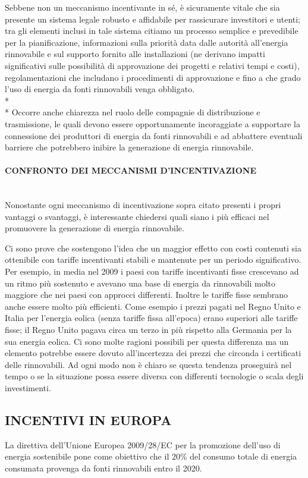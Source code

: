 \documentclass[12pt,a4paper,openright,twoside]{report}
\newcommand{\myparagraph}[1]{\paragraph{#1}\mbox{}\\}
\begin{document}
Sebbene non un meccanismo incentivante in sé, è sicuramente vitale che sia presente un sistema legale robusto e affidabile per rassicurare investitori e utenti; tra gli elementi inclusi in tale sistema citiamo un processo semplice e prevedibile per la pianificazione, informazioni sulla priorità data dalle autorità all'energia rinnovabile e sul supporto fornito alle installazioni (ne derivano impatti significativi sulle possibilità di approvazione dei progetti e relativi tempi e costi), regolamentazioni che includano i procedimenti di approvazione e fino a che grado l'uso di energia da fonti rinnovabili venga obbligato.\\*\\* 
Occorre anche chiarezza nel ruolo delle compagnie di distribuzione e trasmissione, le quali devono essere opportunamente incoraggiate a supportare la connessione dei produttori di energia da fonti rinnovabili e ad abbattere eventuali barriere che potrebbero inibire la generazione di energia rinnovabile.

\myparagraph{CONFRONTO DEI MECCANISMI D'INCENTIVAZIONE}
Nonostante ogni meccanismo di incentivazione sopra citato presenti i propri vantaggi o svantaggi, è interessante chiedersi quali siano i più efficaci nel promuovere la generazione di energia rinnovabile.

Ci sono prove che sostengono l'idea che un maggior effetto con costi contenuti sia ottenibile con tariffe incentivanti stabili e mantenute per un periodo significativo. Per esempio, in media nel 2009 i paesi con tariffe incentivanti fisse crescevano ad un ritmo più sostenuto e avevano una base di energia da rinnovabili molto maggiore che nei paesi con approcci differenti. Inoltre le tariffe fisse sembrano anche essere molto più efficienti. Come esempio i prezzi pagati nel Regno Unito e Italia per l'energia eolica (senza tariffe fissa all'epoca) erano superiori alle tariffe fisse; il Regno Unito pagava circa un terzo in più rispetto alla Germania  per la sua energia eolica. Ci sono molte ragioni possibili per questa differenza ma un elemento potrebbe essere dovuto all'incertezza dei prezzi che circonda i certificati delle rinnovabili. Ad ogni modo non è chiaro se questa tendenza proseguirà nel tempo o se la situazione possa essere diversa con differenti tecnologie o scala degli investimenti. 

\subsection[INCENTIVI EUROPEI]{\nohyphens{INCENTIVI IN EUROPA}}
La direttiva dell'Unione Europea 2009/28/EC per la promozione dell'uso di energia sostenibile pone come obiettivo che il 20\% del consumo totale di energia consumata provenga da fonti rinnovabili entro il 2020.
\end{document}
